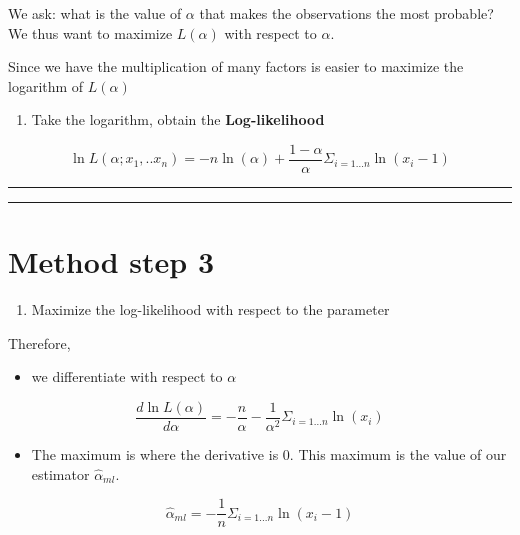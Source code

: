 \documentclass[
]{book}
\providecommand{\tightlist}{%
  \setlength{\itemsep}{0pt}\setlength{\parskip}{0pt}}
\begin{document}
We ask: what is the value of \(\alpha\) that makes the observations the most probable? We thus want to maximize \(L(\alpha)\) with respect to \(\alpha\).

Since we have the multiplication of many factors is easier to maximize the logarithm of \(L(\alpha)\)

\begin{enumerate}
\def\labelenumi{\arabic{enumi}.}
\setcounter{enumi}{1}
\tightlist
\item
  Take the logarithm, obtain the \textbf{Log-likelihood}
\end{enumerate}

\[\ln L(\alpha;x_1,..x_n)= -n \ln(\alpha) + {\frac{1-\alpha}{\alpha}} \Sigma_{i=1...n} \ln (x_i-1)\]

\begin{center}\rule{0.5\linewidth}{0.5pt}\end{center}

\begin{center}\rule{0.5\linewidth}{0.5pt}\end{center}

\hypertarget{method-step-3}{%
\section{Method step 3}\label{method-step-3}}

\begin{enumerate}
\def\labelenumi{\arabic{enumi}.}
\setcounter{enumi}{2}
\tightlist
\item
  Maximize the log-likelihood with respect to the parameter
\end{enumerate}

Therefore,

\begin{itemize}
\tightlist
\item
  we differentiate with respect to \(\alpha\)
\end{itemize}

\[\frac{d \ln L(\alpha)}{d \alpha}= -\frac{n}{\alpha} - \frac{1}{\alpha^2}  \Sigma_{i=1...n} \ln (x_i)\]

\begin{itemize}
\tightlist
\item
  The maximum is where the derivative is \(0\). This maximum is the value of our estimator \(\hat{\alpha}_{ml}\).
\end{itemize}

\[\hat{\alpha}_{ml}=-\frac{1}{n}\Sigma_{i=1...n} \ln (x_i-1)\]
\end{document}
